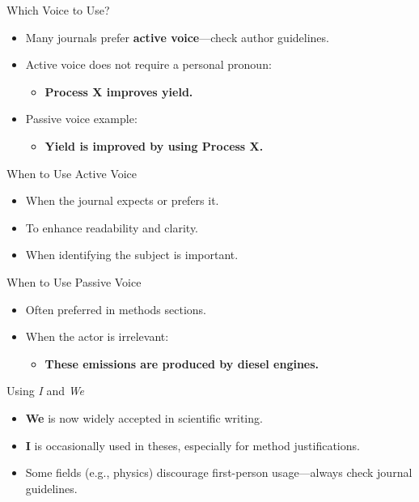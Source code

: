 \begin{frame}{Which Voice to Use?}
  \begin{itemize}
    \item Many journals prefer \textbf{active voice}—check author guidelines. \pause
    \item Active voice does not require a personal pronoun:
      \begin{itemize}
        \item \textbf{Process X improves yield.} \pause
      \end{itemize}
    \item Passive voice example:
      \begin{itemize}
        \item \textbf{Yield is improved by using Process X.}
      \end{itemize}
  \end{itemize}
\end{frame}

\begin{frame}{When to Use Active Voice}
  \begin{itemize}
    \item When the journal expects or prefers it. \pause
    \item To enhance readability and clarity. \pause
    \item When identifying the subject is important.
  \end{itemize}
\end{frame}

\begin{frame}{When to Use Passive Voice}
  \begin{itemize}
    \item Often preferred in methods sections. \pause
    \item When the actor is irrelevant:
      \begin{itemize}
        \item \textbf{These emissions are produced by diesel engines.}
      \end{itemize}
  \end{itemize}
\end{frame}

\begin{frame}{Using \textit{I} and \textit{We}}
  \begin{itemize}
    \item \textbf{We} is now widely accepted in scientific writing. \pause
    \item \textbf{I} is occasionally used in theses, especially for method justifications. \pause
    \item Some fields (e.g., physics) discourage first-person usage—always check journal guidelines.
  \end{itemize}
\end{frame}
